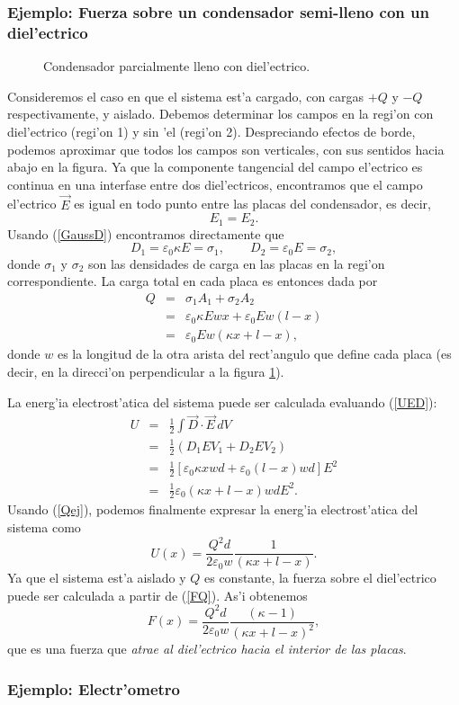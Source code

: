 \subsubsection{Ejemplo: Fuerza sobre un condensador semi-lleno con un
diel'ectrico}
\begin{figure}[!h]
\centerline{}
\caption{Condensador parcialmente lleno con diel'ectrico.}
\label{fig:fccd}
\end{figure}
Consideremos el caso en que el sistema est'a cargado, con cargas $+Q$ y $-Q$
respectivamente, y aislado. Debemos determinar los campos en la regi'on con
diel'ectrico (regi'on 1) y sin 'el (regi'on 2). Despreciando efectos de borde,
podemos aproximar que todos los campos son verticales, con sus sentidos hacia
abajo en la figura. Ya que la componente tangencial del campo el'ectrico es
continua en una interfase entre dos diel'ectricos, encontramos que el campo
el'ectrico $\vec{E}$ es igual en todo punto entre las placas del condensador,
es decir,
\begin{equation}
 E_1=E_2.
\end{equation}
Usando (\ref{GaussD}) encontramos directamente que
\begin{equation}
 D_1=\varepsilon_0\kappa E=\sigma_1, \qquad D_2=\varepsilon_0 E=\sigma_2,
\end{equation}
donde $\sigma_1$ y $\sigma_2$ son las densidades de carga en las placas en la
regi'on correspondiente. La carga total en cada placa es entonces dada por
\begin{eqnarray}
 Q&=&\sigma_1A_1+\sigma_2A_2 \\
&=& \varepsilon_0\kappa E w x+\varepsilon_0E w (l-x) \\
&=& \varepsilon_0Ew\left(\kappa x+l-x\right), \label{Qej}
\end{eqnarray}
donde $w$ es la longitud de la otra arista del rect'angulo que define cada placa (es decir, en la direcci'on perpendicular a la figura \ref{fig:fccd}).

La energ'ia electrost'atica del sistema puede ser calculada evaluando
(\ref{UED}):
\begin{eqnarray}
 U&=&\frac{1}{2}\int\vec{D}\cdot\vec{E}\,dV \\
&=&\frac{1}{2}\left(D_1EV_1+D_2EV_2\right) \\
&=&\frac{1}{2}\left[\varepsilon_0\kappa
xwd+\varepsilon_0(l-x)wd\right]E^2 \\
&=&\frac{1}{2}\varepsilon_0\left(\kappa x+l-x\right)wdE^2 .
\end{eqnarray}
Usando (\ref{Qej}), podemos finalmente expresar la energ'ia electrost'atica
del sistema como
\begin{equation}
U(x)=\frac{Q^2d}{2\varepsilon_0 w}\frac{1}{(\kappa x+l-x)}.
\end{equation}
Ya que el sistema est'a aislado y $Q$ es constante, la fuerza sobre el
diel'ectrico puede ser calculada a partir de (\ref{FQ}). As'i obtenemos
\begin{equation}
 F(x)=\frac{Q^2d}{2\varepsilon_0 w}\frac{(\kappa-1)}{(\kappa x+l-x)^2},
\end{equation}
que es una fuerza que \textit{atrae al diel'ectrico hacia el interior de las
placas}.

\subsubsection{Ejemplo: Electr'ometro}